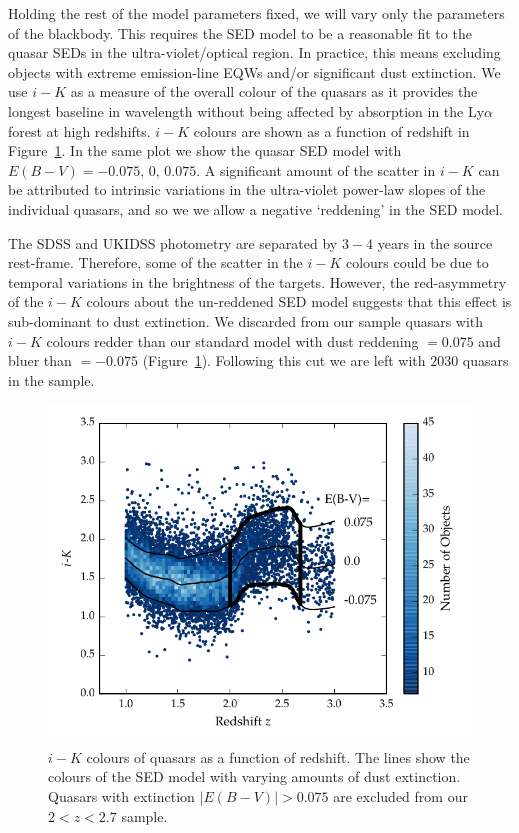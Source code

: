 Holding the rest of the model parameters fixed, we will vary only the parameters of the blackbody. 
This requires the SED model to be a reasonable fit to the quasar SEDs in the ultra-violet/optical region. 
In practice, this means excluding objects with extreme emission-line EQWs and/or significant dust extinction.
We use $i-K$ as a measure of the overall colour of the quasars as it provides the longest baseline in wavelength without being affected by absorption in the Ly$\alpha$ forest at high redshifts. 
$i-K$ colours are shown as a function of redshift in Figure~\ref{fig:ikzplot}.
In the same plot we show the quasar SED model with $E(B-V)=-0.075,\,0,\,0.075$. 
A significant amount of the scatter in $i-K$ can be attributed to intrinsic variations in the ultra-violet power-law slopes of the individual quasars, and so we we allow a negative `reddening' in the SED model. 

The SDSS and UKIDSS photometry are separated by $3-4$ years in the source rest-frame. 
Therefore, some of the scatter in the $i-K$ colours could be due to temporal variations in the brightness of the targets. 
However, the red-asymmetry of the $i-K$ colours about the un-reddened SED model suggests that this effect is sub-dominant to dust extinction. 
We discarded from our sample quasars with $i - K$ colours redder than our standard model with dust reddening \ebv $= 0.075$ and bluer than \ebv $=-0.075$ (Figure~\ref{fig:ikzplot}). 
Following this cut we are left with $2030$ quasars in the sample. 

\begin{figure}[t!]
  \centering
  \includegraphics[width=\columnwidth]{figures/chapter05/ik_versus_z_low_ext.pdf}
  \caption[{$i-K$ colours of non-BAL DR$7$ quasars with $i>19.1$ as a function of redshift.}]{$i-K$ colours of quasars as a function of redshift. The lines show the colours of the SED model with varying amounts of dust extinction. Quasars with extinction $|E(B-V)|>0.075$ are excluded from our $2 < z < 2.7$ sample.}
  \label{fig:ikzplot}
\end{figure}

